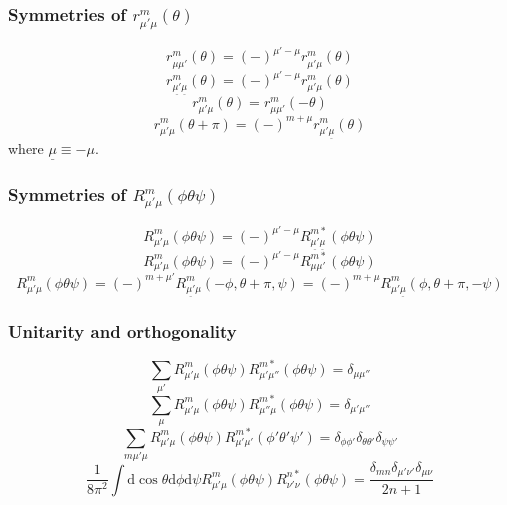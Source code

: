 \subsubsection*{Symmetries of $r_{\mu'\mu}^{m}(\theta)$}

\begin{equation}
r_{\mu\mu'}^{m}(\theta)=(-)^{\mu'-\mu}r_{\mu'\mu}^{m}(\theta)
\end{equation}
\begin{equation}
r_{\underline{\mu'}\underline{\mu}}^{m}(\theta)=\left(-\right)^{\mu'-\mu}r_{\mu'\mu}^{m}(\theta)
\end{equation}
\begin{equation}
r_{\mu'\mu}^{m}(\theta)=r_{\mu\mu'}^{m}(-\theta)
\end{equation}
\begin{equation}
r_{\mu'\mu}^{m}(\theta+\pi)=(-)^{m+\mu}r_{\mu'\underline{\mu}}^{m}(\theta)
\end{equation}
where $\underline{\mu}\equiv-\mu$.

\subsubsection*{Symmetries of $R_{\mu'\mu}^{m}(\phi\theta\psi)$}

\begin{equation}
R_{\mu'\mu}^{m}(\phi\theta\psi)=\left(-\right)^{\mu'-\mu}R_{\underline{\mu'}\underline{\mu}}^{m*}(\phi\theta\psi)\label{eq:symm-gsh-1}
\end{equation}
\begin{equation}
R_{\mu'\mu}^{m}(\phi\theta\psi)=\left(-\right)^{\mu'-\mu}R_{\mu\mu'}^{m*}(\phi\theta\psi)
\end{equation}
\begin{equation}
R_{\mu'\mu}^{m}(\phi\theta\psi)=(-)^{m+\mu'}R_{\underline{\mu'}\mu}^{m}(-\phi,\theta+\pi,\psi)=(-)^{m+\mu}R_{\mu'\underline{\mu}}^{m}(\phi,\theta+\pi,-\psi)
\end{equation}


\subsubsection*{Unitarity and orthogonality}

\begin{equation}
\sum_{\mu'}R_{\mu'\mu}^{m}(\phi\theta\psi)R_{\mu'\mu''}^{m*}(\phi\theta\psi)=\delta_{\mu\mu''}
\end{equation}
\begin{equation}
\sum_{\mu}R_{\mu'\mu}^{m}(\phi\theta\psi)R_{\mu''\mu}^{m*}(\phi\theta\psi)=\delta_{\mu'\mu''}
\end{equation}
\begin{equation}
\sum_{m\mu'\mu}R_{\mu'\mu}^{m}(\phi\theta\psi)R_{\mu'\mu'}^{m*}(\phi'\theta'\psi')=\delta_{\phi\phi'}\delta_{\theta\theta'}\delta_{\psi\psi'}
\end{equation}
\begin{equation}
\frac{1}{8\pi^{2}}\int\mathrm{d}\cos\theta\mathrm{d}\phi\mathrm{d}\psi R_{\mu'\mu}^{m}(\phi\theta\psi)R_{\nu'\nu}^{n*}(\phi\theta\psi)=\frac{\delta_{mn}\delta_{\mu'\nu'}\delta_{\mu\nu}}{2n+1}\label{eq:gsh-orthogonality}
\end{equation}


